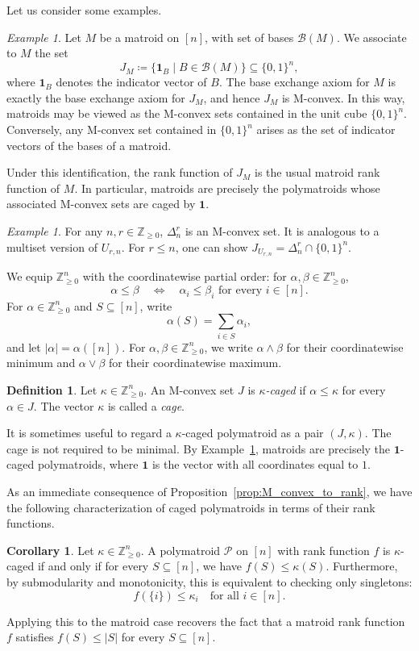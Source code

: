 \documentclass[11pt]{article}
\theoremstyle{definition}
\newtheorem{corollary}[theorem]{Corollary}
\newtheorem{definition}[theorem]{Definition}
\theoremstyle{remark}
\newtheorem{example}[theorem]{Example}
\newcommand{\Zgeq}{\mathbb{Z}_{\geq 0}}       %
\newcommand{\Zgeqn}{\mathbb{Z}_{\geq 0}^n}     %
\newcommand{\dnr}{\Delta_n^r}
\newcommand{\ones}{\textbf{1}}
\begin{document}
Let us consider some examples.
\begin{example}\label{example:matroids_are_polymatroids}
    Let $M$ be a matroid on $[n]$, with set of bases $\mathcal{B}(M)$. We associate to $M$ the set
    \[
        J_M \coloneqq \{\ones_B \mid B \in \mathcal{B}(M)\} \subseteq \{0,1\}^n,
    \]
    where $\ones_B$ denotes the indicator vector of $B$. The base exchange axiom for $M$ is exactly the base exchange axiom for $J_M$, and hence $J_M$ is M-convex. In this way, matroids may be viewed as the M-convex sets contained in the unit cube $\{0,1\}^n$. Conversely, any M-convex set contained in $\{0,1\}^n$ arises as the set of indicator vectors of the bases of a matroid.

    Under this identification, the rank function of $J_M$ is the usual matroid rank function of $M$. In particular, matroids are precisely the polymatroids whose associated M-convex sets are caged by $\ones$.
\end{example}
\begin{example}
    For any $n,r \in \Zgeq$, $\dnr$ is an M-convex set. It is analogous to a multiset version of $U_{r,n}$. For $r \leq n$, one can show $J_{U_{r,n}} = \dnr \cap \{ 0,1\}^n$. 
\end{example}

We equip $\Zgeqn$ with the coordinatewise partial order: for $\alpha,\beta\in\Zgeqn$,
\[
    \alpha\leq\beta
    \quad\Longleftrightarrow\quad
    \alpha_i\leq\beta_i \text{ for every } i\in[n].
\]
For $\alpha\in\Zgeqn$ and $S\subseteq[n]$, write
\[
    \alpha(S)=\sum_{i\in S}\alpha_i,
\]
and let $|\alpha|=\alpha([n])$. For $\alpha,\beta\in\Zgeqn$, we write $\alpha\wedge\beta$ for their coordinatewise minimum and $\alpha\vee\beta$ for their coordinatewise maximum.
\begin{definition}\label{def:caged_polymatroids}
    Let $\kappa\in\Zgeqn$. An M-convex set $J$ is \emph{$\kappa$-caged} if $\alpha\leq\kappa$ for every $\alpha\in J$. The vector $\kappa$ is called a \emph{cage}.
\end{definition}
It is sometimes useful to regard a $\kappa$-caged polymatroid as a pair $(J,\kappa)$. The cage is not required to be minimal. By Example~\ref{example:matroids_are_polymatroids}, matroids are precisely the $\ones$-caged polymatroids, where $\ones$ is the vector with all coordinates equal to $1$.

As an immediate consequence of Proposition~\ref{prop:M_convex_to_rank}, we have the following characterization of caged polymatroids in terms of their rank functions.
\begin{corollary} \label{corollary:caged_polymatroids_rank}
    Let $\kappa \in \Zgeqn$. A polymatroid $\mathcal{P}$ on $[n]$ with rank function $f$ is $\kappa$-caged if and only if for every $S \subseteq [n]$, we have $f(S) \leq \kappa(S)$. Furthermore, by submodularity and monotonicity, this is equivalent to checking only singletons: 
    \[
    f(\{i\}) \leq \kappa_i \quad \text{for all } i \in [n].
    \]
\end{corollary}
Applying this to the matroid case recovers the fact that a matroid rank function $f$ satisfies $f(S) \leq |S|$ for every $S \subseteq [n]$.
\end{document}
